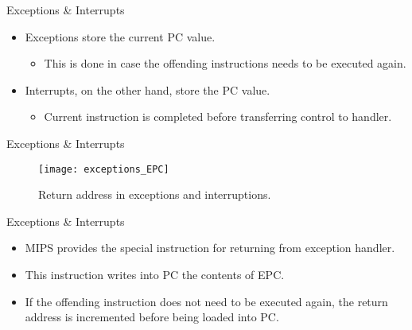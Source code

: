 % 
\begin{frame}{Exceptions \& Interrupts}{}
\begin{itemize}
\item Exceptions store the current \ac{PC} value.
\begin{itemize}
\item This is done in case the offending instructions needs to be executed again.
\end{itemize}
\item Interrupts, on the other hand, store the  \ac{PC} value.
\begin{itemize}
\item Current instruction is completed before transferring control to handler.
\end{itemize}
\end{itemize}
\end{frame}

% 
\begin{frame}{Exceptions \& Interrupts}{}
\begin{figure}
\centering
\texttt{[image: exceptions\_EPC]}
\caption{Return address in exceptions and interruptions.}
\label{Figure:exception_EPC}
\end{figure}
\end{frame}

% 
\begin{frame}{Exceptions \& Interrupts}{}
\begin{itemize}
\item \ac{MIPS} provides the special instruction  for returning from exception handler.
\item This instruction writes into \ac{PC} the contents of \ac{EPC}.
\item If the offending instruction does not need to be executed again, the return address is incremented before being loaded into \ac{PC}.
\end{itemize}
\end{frame}

